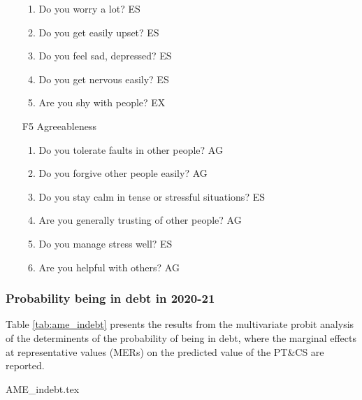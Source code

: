 \documentclass[a4paper, 11pt, onecolumn]{article}
\begin{document}
\begin{itemize}
\begin{enumerate}
	\item Do you worry a lot? ES
	\item Do you get easily upset? ES
	\item Do you feel sad, depressed? ES
	\item Do you get nervous easily? ES
	\item Are you shy with people? EX
	\end{enumerate}
\item[F5] Agreeableness
	\begin{enumerate}
	\item Do you tolerate faults in other people? AG
	\item Do you forgive other people easily?  AG
	\item Do you stay calm in tense or stressful situations? ES
	\item Are you generally trusting of other people? AG
	\item Do you manage stress well? ES
	\item Are you helpful with others? AG
	\end{enumerate}
\end{itemize}


\subsubsection*{Probability being in debt in 2020-21}
Table \ref{tab:ame_indebt} presents the results from the multivariate probit analysis of the determinents of the probability of being in debt, where the marginal effects at representative values (MERs) on the predicted value of the PT\&CS are reported.



{AME_indebt.tex}
\end{document}
